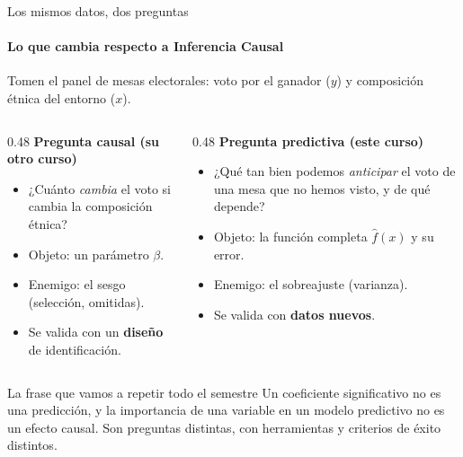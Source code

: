 \documentclass{beamer}
\newcommand{\1}{\mathbb{I}}
\begin{document}
\begin{frame}{Los mismos datos, dos preguntas}
\framesubtitle{Lo que cambia respecto a Inferencia Causal}
\small
Tomen el panel de mesas electorales: voto por el ganador ($y$) y composición étnica del entorno ($x$).
\pause
\vspace{0.15cm}
\begin{columns}[T]
\begin{column}{0.48\textwidth}
\textbf{Pregunta causal (su otro curso)}
\begin{itemize}\itemsep3pt
  \item ¿Cuánto \emph{cambia} el voto si cambia la composición étnica?
  \item Objeto: un parámetro $\beta$.
  \item Enemigo: el sesgo (selección, omitidas).
  \item Se valida con un \textbf{diseño} de identificación.
\end{itemize}
\end{column}
\begin{column}{0.48\textwidth}
\textbf{Pregunta predictiva (este curso)}
\begin{itemize}\itemsep3pt
  \item ¿Qué tan bien podemos \emph{anticipar} el voto de una mesa que no hemos visto, y de qué depende?
  \item Objeto: la función completa $\hat{f}(x)$ y su error.
  \item Enemigo: el sobreajuste (varianza).
  \item Se valida con \textbf{datos nuevos}.
\end{itemize}
\end{column}
\end{columns}
\pause

\vspace{0.3cm}
\begin{block}{La frase que vamos a repetir todo el semestre}
Un coeficiente significativo no es una predicción, y la importancia de una variable en un modelo predictivo no es un efecto causal. Son preguntas distintas, con herramientas y criterios de éxito distintos.
\end{block}
\end{frame}
\end{document}
